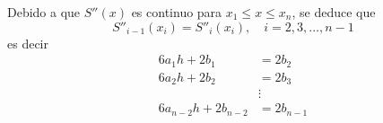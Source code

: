 \begin{tcolorbox}[
        arc=0mm, 
        bottomtitle=0.5mm,
        boxrule=0mm,
        colbacktitle=black!10!white, 
        coltitle=black,
        left=2.5mm,
        leftrule=1mm,
        right=3.5mm,
        title={$S''(x)$ es continua en $[x_1, x_n]$.},
        toptitle=0.75mm,
        colframe=black!30!white,
    ]
    Debido a que $S''(x)$ es continuo para $x_1 \leq x \leq x_n$, se deduce que
    $$S''_{i-1}(x_i) = S''_i(x_i), \quad i = 2, 3, \dots, n-1$$
    es decir
    \begin{equation}
        \begin{aligned}
            6a_1h + 2b_1 & = 2b_2 \\
            6a_2h + 2b_2 & = 2b_3 \\
            & \vdots \\
            6a_{n-2}h + 2b_{n-2} & = 2b_{n-1}
        \end{aligned} \label{YAYACCXFTQTRQRTQZFGTA}
    \end{equation}
\end{tcolorbox}

